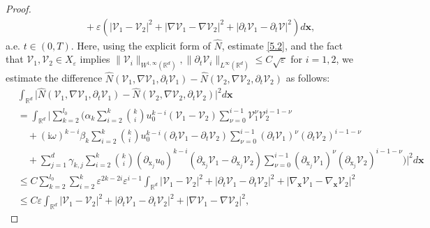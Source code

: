 \documentclass[11pt,reqno,oneside]{amsart}
\numberwithin{equation}{section}
\theoremstyle{definition}
\theoremstyle{remark}
\numberwithin{equation}{section}
\begin{document}
\begin{proof}
\begin{equation}
\begin{aligned}
				&\quad \quad \quad +{\varepsilon}\left(\left|\mathscr{V}_1-\mathscr{V}_2 \right|^2+\left|\nabla\mathscr{V}_1-\nabla\mathscr{V}_2 \right|^2+\left|\partial_t\mathscr{V}_1-\partial_t\mathscr{V} \right|^2\right) d\mathbf{x},
			\end{aligned}		
		\end{equation}
		a.e. $t\in \left(0,T\right)$. Here, using the explicit form of $\hat{N}$, estimate \eqref{5.2}, and the fact that $\mathscr{V}_1,\mathscr{V}_2 \in X_{\varepsilon}$ implies $\|\mathscr{V}_i\|_{W^{1,\infty}(\mathbb{R}^d)} ,\|\partial_t\mathscr{V}_i\|_{L^{\infty}(\mathbb{R}^d)}\leqslant C\sqrt{\varepsilon}$ for $i=1,2$, we estimate the difference $\hat{N}(\mathscr{V}_1, \nabla \mathscr{V}_1, \partial_t \mathscr{V}_1)-\hat{N}(\mathscr{V}_2, \nabla \mathscr{V}_2, \partial_t \mathscr{V}_2)$ as follows:
		\begin{equation*}
			\begin{aligned}
				&\int_{\mathbb{R}^d}\bigg|\hat{N}(\mathscr{V}_1, \nabla \mathscr{V}_1, \partial_t \mathscr{V}_1)-\hat{N}(\mathscr{V}_2, \nabla \mathscr{V}_2, \partial_t \mathscr{V}_2) \bigg|^2d\mathbf{x}\\
				&=\int_{\mathbb{R}^d} \bigg|\sum_{k=2}^{l_0} \bigg( \alpha_k \sum_{i=2}^k \binom{k}{i} u_{0}^{k-i} \left(\mathscr{V}_1-\mathscr{V}_2\right)\sum_{\nu =0}^{i-1}\mathscr{V}^{\nu}_{1}\mathscr{V}^{i-1-\nu}_{2}  \\
				&\quad+ \left(\mathrm{i}\omega\right)^{k-i}\beta_k \sum_{i=2}^k \binom{k}{i} u_{0}^{k-i} \left(\partial_{t}\mathscr{V}_1-\partial_{t}\mathscr{V}_2\right)\sum_{\nu =0}^{i-1}(\partial_{t}\mathscr{V}_1)^{\nu}(\partial_{t}\mathscr{V}_2)^{i-1-\nu}  \\
				&\quad +  \sum_{j=1}^d \gamma_{k,j}\sum_{i=2}^k \binom{k}{i} (\partial_{\mathrm{x}_j} u_{0})^{k-i} \left(\partial_{\mathrm{x}_j}\mathscr{V}_1-\partial_{\mathrm{x}_j}\mathscr{V}_2\right)\sum_{\nu =0}^{i-1}(\partial_{\mathrm{x}_j}\mathscr{V}_1)^{\nu}(\partial_{\mathrm{x}_j}\mathscr{V}_2)^{i-1-\nu}  \bigg) \bigg|^2 d\mathbf{x}\\
				&\leqslant C \sum_{k=2}^{l_0}\sum_{i=2}^{k}\varepsilon^{2k-2i}\varepsilon^{i-1}\int_{\mathbb{R}^d} |\mathscr{V}_1-\mathscr{V}_2|^2+|\partial_{t}\mathscr{V}_1-\partial_{t}\mathscr{V}_2|^2+|\nabla_{\mathbf{x}}{\mathscr{V}_1}-\nabla_{\mathbf{x}}{\mathscr{V}_2}|^2\\
				&\leqslant C \varepsilon \int_{\mathbb{R}^d} |\mathscr{V}_1-\mathscr{V}_2|^2+|\partial_{t}\mathscr{V}_1-\partial_{t}\mathscr{V}_2|^2+|\nabla{\mathscr{V}_1}-\nabla{\mathscr{V}_2}|^2,

\end{aligned}
\end{equation*}
\end{proof}
\end{document}
